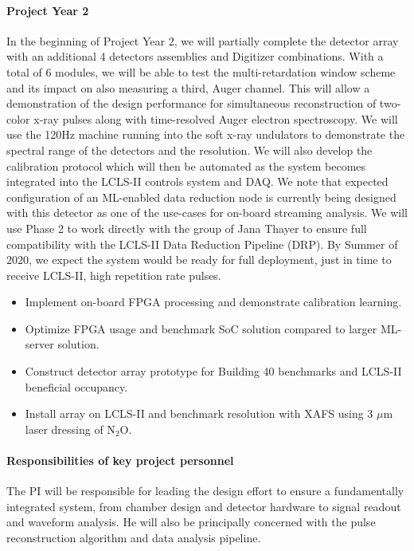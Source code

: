 \paragraph*{Project Year 2}
In the beginning of Project Year 2, we will partially complete the detector array with an additional 4 detectors assemblies and Digitizer combinations.
With a total of 6 modules, we will be able to test the multi-retardation window scheme and its impact on also measuring a third, Auger channel.
This will allow a demonstration of the design performance for simultaneous reconstruction of two-color x-ray pulses along with time-resolved Auger electron spectroscopy.
We will use the 120Hz machine running into the soft x-ray undulators to demonstrate the spectral range of the detectors and the resolution.  
We will also develop the calibration protocol which will then be automated as the system becomes integrated into the LCLS-II controls system and DAQ.  
We note that expected configuration of an ML-enabled data reduction node is currently being designed with this detector as one of the use-cases for on-board streaming analysis.  
We will use Phase 2 to work directly with the group of Jana Thayer to ensure full compatibility with the LCLS-II Data Reduction Pipeline (DRP).  
By Summer of 2020, we expect the system would be ready for full deployment, just in time to receive LCLS-II, high repetition rate pulses.
\begin{itemize}
\item Implement on-board FPGA processing and demonstrate calibration learning.
\item Optimize FPGA usage and benchmark SoC solution compared to larger ML-server solution.
\item Construct detector array prototype for Building 40 benchmarks and LCLS-II beneficial occupancy.
\item Install array on LCLS-II and benchmark resolution with XAFS using 3 $\mu$m laser dressing of N$_2$O.
\end{itemize}

\paragraph*{Responsibilities of key project personnel}
The PI will be responsible for leading the design effort to ensure a fundamentally integrated system, from chamber design and detector hardware to signal readout and waveform analysis.
He will also be principally concerned with the pulse reconstruction algorithm and data analysis pipeline.

